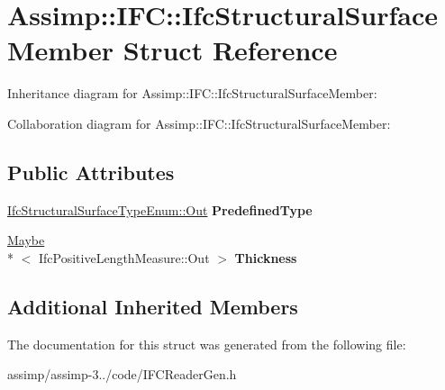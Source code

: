 \hypertarget{struct_assimp_1_1_i_f_c_1_1_ifc_structural_surface_member}{\section{Assimp\+:\+:I\+F\+C\+:\+:Ifc\+Structural\+Surface\+Member Struct Reference}
\label{struct_assimp_1_1_i_f_c_1_1_ifc_structural_surface_member}
}


Inheritance diagram for Assimp\+:\+:I\+F\+C\+:\+:Ifc\+Structural\+Surface\+Member\+:


Collaboration diagram for Assimp\+:\+:I\+F\+C\+:\+:Ifc\+Structural\+Surface\+Member\+:
\subsection*{Public Attributes}
\begin{DoxyCompactItemize}
\item 
\hypertarget{struct_assimp_1_1_i_f_c_1_1_ifc_structural_surface_member_a444fba974cfd88ed8ef8e19ea6833903}{\hyperlink{classboost_1_1shared__ptr}{Ifc\+Structural\+Surface\+Type\+Enum\+::\+Out} {\bfseries Predefined\+Type}}\label{struct_assimp_1_1_i_f_c_1_1_ifc_structural_surface_member_a444fba974cfd88ed8ef8e19ea6833903}

\item 
\hypertarget{struct_assimp_1_1_i_f_c_1_1_ifc_structural_surface_member_a751998681881e7d0d946ea34309b4b8a}{\hyperlink{struct_assimp_1_1_s_t_e_p_1_1_maybe}{Maybe}\\*
$<$ Ifc\+Positive\+Length\+Measure\+::\+Out $>$ {\bfseries Thickness}}\label{struct_assimp_1_1_i_f_c_1_1_ifc_structural_surface_member_a751998681881e7d0d946ea34309b4b8a}

\end{DoxyCompactItemize}
\subsection*{Additional Inherited Members}


The documentation for this struct was generated from the following file\+:\begin{DoxyCompactItemize}
\item 
assimp/assimp-\/3../code/I\+F\+C\+Reader\+Gen.\+h\end{DoxyCompactItemize}
